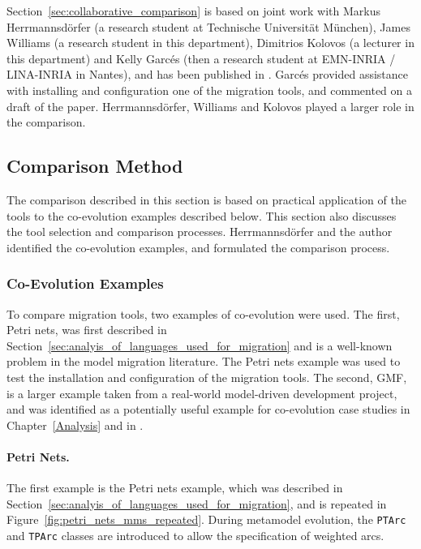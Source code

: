 \begin{framed}
Section~\ref{sec:collaborative_comparison} is based on joint work with Markus Herrmannsd\"{o}rfer (a research student at Technische Universit\"at M\"unchen), James Williams (a research student in this department), Dimitrios Kolovos (a lecturer in this department) and Kelly Garc\'{e}s (then a research student at EMN-INRIA / LINA-INRIA in Nantes), and has been published in \cite{rose10comparison}. Garc\'{e}s provided assistance with installing and configuration one of the migration tools, and commented on a draft of the paper. Herrmannsd\"{o}rfer, Williams and Kolovos played a larger role in the comparison.
\end{framed}

\subsection{Comparison Method}
\label{sec:method}

\newcommand{\mm}[1]{\texttt{#1}}
The comparison described in this section is based on practical application of the tools to the co-evolution examples described below. This section also discusses the tool selection and comparison processes. Herrmannsd\"{o}rfer and the author identified the co-evolution examples, and formulated the comparison process.

\subsubsection{Co-Evolution Examples}
\label{subsec:method_examples}
To compare migration tools, two examples of co-evolution were used. The first, Petri nets, was first described in Section~\ref{sec:analyis_of_languages_used_for_migration} and is a well-known problem in the model migration literature. The Petri nets example was used to test the installation and configuration of the migration tools. The second, GMF, is a larger example taken from a real-world model-driven development project, and was identified as a potentially useful example for co-evolution case studies in Chapter~\ref{Analysis} and in \cite{herrmannsdoerfer09gmf}.

\paragraph{Petri Nets.}
The first example is the Petri nets example, which was described in Section~\ref{sec:analyis_of_languages_used_for_migration}, and is repeated in Figure~\ref{fig:petri_nets_mms_repeated}. During metamodel evolution, the \mm{PTArc} and \mm{TPArc} classes are introduced to allow the specification of weighted arcs.

